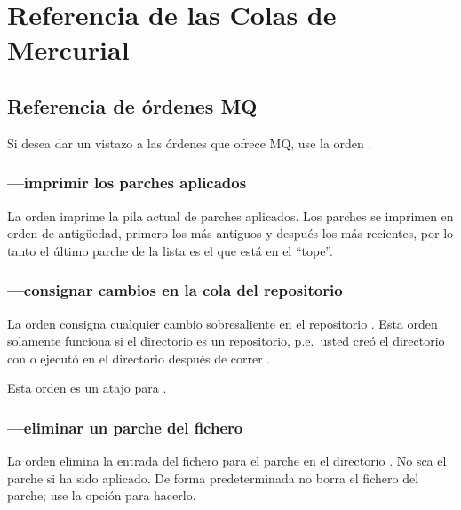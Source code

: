 \chapter{Referencia de las Colas de Mercurial}
\label{chap:mqref}

\section{Referencia de órdenes MQ}
\label{sec:mqref:cmdref}

Si desea dar un vistazo a las órdenes que ofrece MQ, use la orden
.

\subsection{---imprimir los parches aplicados}

La orden  imprime la pila actual de parches
aplicados.  Los parches se imprimen en orden de antigüedad, primero
los más antiguos y después los más recientes, por lo tanto el último
parche de la lista es el que está en el ``tope''.

\subsection{---consignar cambios en la cola del repositorio}

La orden  consigna cualquier cambio sobresaliente
en el repositorio .  Esta orden solamente
funciona si el directorio  es un repositorio,
p.e.~usted creó el directorio con
 o ejecutó
 en el directorio después de correr .

Esta orden es un atajo para .

\subsection{---eliminar un parche del fichero
  }

La orden  elimina la entrada del fichero
 para el parche en el directorio
.  No sca el parche si ha sido aplicado.  De
forma predeterminada no borra el fichero del parche; use la opción
 para hacerlo.

